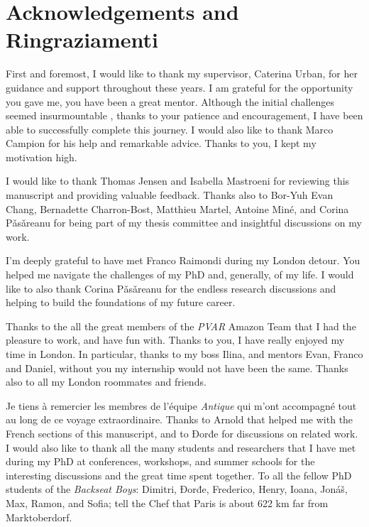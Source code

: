 \chapter*{Acknowledgements and Ringraziamenti}

First and foremost, I would like to thank my supervisor, Caterina Urban, for her guidance and support throughout these years. I am grateful for the opportunity you gave me, you have been a great mentor.
Although the initial challenges seemed insurmountable
, thanks to your patience and encouragement, I have been able to successfully complete this journey.
I would also like to thank Marco Campion for his help and remarkable advice. Thanks to you, I kept my motivation high.

I would like to thank Thomas Jensen and Isabella Mastroeni for reviewing this manuscript and providing valuable feedback. Thanks also to Bor-Yuh Evan Chang, Bernadette Charron-Bost, Matthieu Martel, Antoine Miné, and Corina Pǎsǎreanu for being part of my thesis committee and insightful discussions on my work.

I'm deeply grateful to have met Franco Raimondi during my London detour. You helped me navigate the challenges of my PhD and, generally, of my life.
I would like to also thank Corina Pǎsǎreanu for the endless research discussions and helping to build the foundations of my future career.

Thanks to the all the great members of the \emph{PVAR} Amazon Team that I had the pleasure to work, and have fun with.
Thanks to you, I have really enjoyed my time in London.
In particular, thanks to my boss Ilina, and mentors Evan, Franco and Daniel, without you my internship would not have been the same. Thanks also to all my London roommates and friends.

Je tiens à remercier les membres de l'équipe \emph{Antique} qui m'ont accompagné tout au long de ce voyage extraordinaire. Thanks to Arnold that helped me with the French sections of this manuscript, and to Đorđe for discussions on related work. I would also like to thank all the many students and researchers that I have met during my PhD at conferences, workshops, and summer schools for the interesting discussions and the great time spent together. To all the fellow PhD students of the \emph{Backseat Boys}:
Dimitri,
Đorđe,
Frederico,
Henry,
Ioana,
Jonáš,
Max,
Ramon, and
Sofia; tell the Chef that Paris is about 622 km far from Marktoberdorf.

